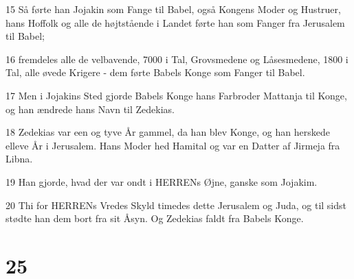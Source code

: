 \par 15 Så førte han Jojakin som Fange til Babel, også Kongens Moder og Hustruer, hans Hoffolk og alle de højtstående i Landet førte han som Fanger fra Jerusalem til Babel;
\par 16 fremdeles alle de velbavende, 7000 i Tal, Grovsmedene og Låsesmedene, 1800 i Tal, alle øvede Krigere - dem førte Babels Konge som Fanger til Babel.
\par 17 Men i Jojakins Sted gjorde Babels Konge hans Farbroder Mattanja til Konge, og han ændrede hans Navn til Zedekias.
\par 18 Zedekias var een og tyve År gammel, da han blev Konge, og han herskede elleve År i Jerusalem. Hans Moder hed Hamital og var en Datter af Jirmeja fra Libna.
\par 19 Han gjorde, hvad der var ondt i HERRENs Øjne, ganske som Jojakim.
\par 20 Thi for HERRENs Vredes Skyld timedes dette Jerusalem og Juda, og til sidst stødte han dem bort fra sit Åsyn. Og Zedekias faldt fra Babels Konge.

\chapter{25}

